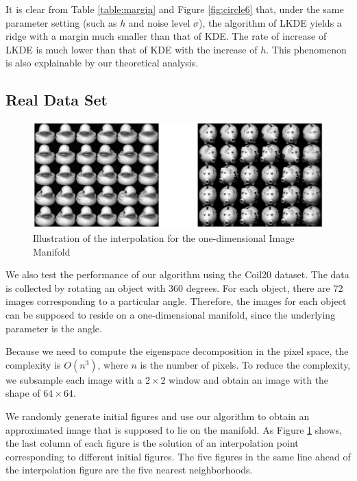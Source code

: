 \documentclass[aos,preprint]{imsart}
\theoremstyle{remark}
\begin{document}
It is clear from Table \ref{table:margin} and Figure \ref{fig:circle6} that, under the same parameter setting (such as $h$ and noise level $\sigma$), the algorithm of LKDE yields a ridge with a margin much smaller than that of KDE. The rate of increase of LKDE is much lower than that of KDE with the increase of $h$. This phenomenon is also explainable by our theoretical analysis.

\subsection{Real Data Set}
\begin{figure}[h] %
   \includegraphics[width=\linewidth]{duck_pig.eps} 
   \caption{Illustration of the interpolation for the one-dimensional Image Manifold}
   \label{fig:interpolation demo}
\end{figure}

We also test the performance of our algorithm using the Coil20 \cite{Coil20} dataset. The data is collected by rotating an object with 360 degrees. For each object, there are 72 images corresponding to a particular angle. Therefore, the images for each object can be supposed to reside on a one-dimensional manifold, since the underlying parameter is the angle.

Because we need to compute the eigenspace decomposition in the pixel space, the complexity is $O(n^3)$, where $n$ is the number of pixels. To reduce the complexity, we subsample each image with a $2\times 2$ window and obtain an image with the shape of $64\times 64$.

We randomly generate initial figures and use our algorithm to obtain an approximated image that is supposed to lie on the manifold. As Figure \ref{fig:interpolation demo} shows, the last column of each figure is the solution of an interpolation point corresponding to different initial figures. The five figures in the same line ahead of the interpolation figure are the five nearest neighborhoods.
\end{document}
